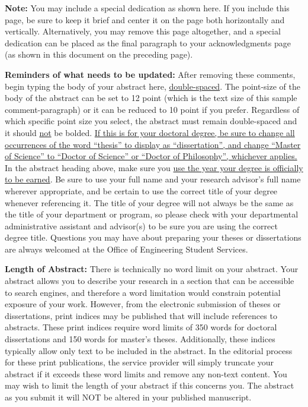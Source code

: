 \begin{thesisdedicationpage}                %
\textbf{Note:} You may include a special dedication as shown here.  If you
include this page, be sure to keep it brief and center it on the page both
horizontally and vertically.  Alternatively, you may remove this page
altogether, and a special dedication can be placed as the final paragraph to
your acknowledgments page (as shown in this document on the preceding page).
\end{thesisdedicationpage}

\cleardoublepage
{}
\begin{thesisabstract}
\textbf{Reminders of what needs to be updated:} 
After removing these comments, begin typing the body of your abstract here,
\uline{double-spaced}.  The point-size of the body of the abstract can be set to
12 point (which is the text size of this sample comment-paragraph) or it can be
reduced to 10 point if you prefer.  Regardless of which specific point size you
select, the abstract must remain double-spaced and it should \uline{not} be
bolded.  \uline{If this is for your doctoral degree, be sure to change all
occurrences of the word ``thesis'' to display as ``dissertation'', and change
``Master of Science'' to ``Doctor of Science'' or ``Doctor of Philosophy'',
whichever applies.}  In the abstract heading above, make sure you \uline{use
the year your degree is officially to be earned}.  Be sure to use your full
name and your research advisor's full name wherever appropriate, and be certain
to use the correct title of your degree whenever referencing it. The title of
your degree will not always be the same as the title of your department or
program, so please check with your departmental administrative assistant and
advisor(s) to be sure you are using the correct degree title.  Questions you
may have about preparing your theses or dissertations are always welcomed at
the Office of Engineering Student Services.

\textbf{Length of Abstract:}
There is technically no word limit on your abstract.  Your abstract allows you
to describe your research in a section that can be accessible to search
engines, and therefore a word limitation would constrain potential exposure of
your work. However, from the electronic submission of theses or dissertations,
print indices may be published that will include references to abstracts. These
print indices require word limits of 350 words for doctoral dissertations and
150 words for master's theses. Additionally, these indices typically allow only
text to be included in the abstract. In the editorial process for these print
publications, the service provider will simply truncate your abstract if it
exceeds these word limits and remove any non-text content. You may wish to
limit the length of your abstract if this concerns you. The abstract as you
submit it will NOT be altered in your published manuscript.


\end{thesisabstract}
